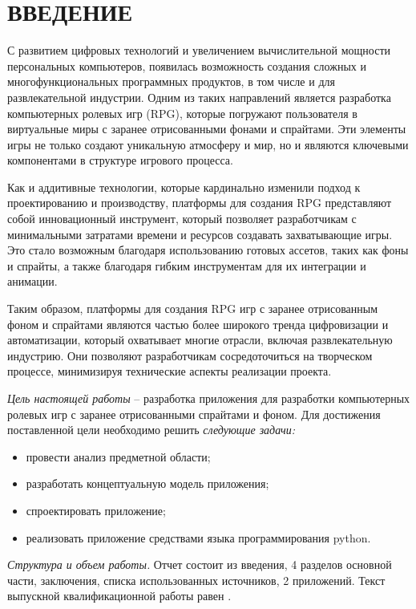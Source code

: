 \section*{ВВЕДЕНИЕ}

С развитием цифровых технологий и увеличением вычислительной мощности персональных компьютеров, появилась возможность создания сложных и многофункциональных программных продуктов, в том числе и для развлекательной индустрии. Одним из таких направлений является разработка компьютерных ролевых игр (RPG), которые погружают пользователя в виртуальные миры с заранее отрисованными фонами и спрайтами. Эти элементы игры не только создают уникальную атмосферу и мир, но и являются ключевыми компонентами в структуре игрового процесса.

Как и аддитивные технологии, которые кардинально изменили подход к проектированию и производству, платформы для создания RPG представляют собой инновационный инструмент, который позволяет разработчикам с минимальными затратами времени и ресурсов создавать захватывающие игры. Это стало возможным благодаря использованию готовых ассетов, таких как фоны и спрайты, а также благодаря гибким инструментам для их интеграции и анимации.

Таким образом, платформы для создания RPG игр с заранее отрисованным фоном и спрайтами являются частью более широкого тренда цифровизации и автоматизации, который охватывает многие отрасли, включая развлекательную индустрию. Они позволяют разработчикам сосредоточиться на творческом процессе, минимизируя технические аспекты реализации проекта.

\emph{Цель настоящей работы} – разработка приложения для разработки компьютерных ролевых игр с заранее отрисованными спрайтами и фоном. Для достижения поставленной цели необходимо решить \emph{следующие задачи:}
\begin{itemize}
\item провести анализ предметной области;
\item разработать концептуальную модель приложения;
\item спроектировать приложение;
\item реализовать приложение средствами языка программирования python.
\end{itemize}

\emph{Структура и объем работы.} Отчет состоит из введения, 4 разделов основной части, заключения, списка использованных источников, 2 приложений. Текст выпускной квалификационной работы равен .

